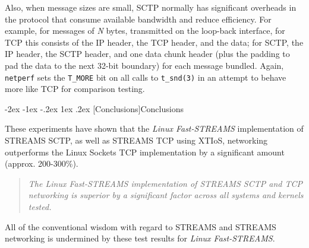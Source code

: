 \documentclass[letterpaper,final,notitlepage,twocolumn,10pt,twoside]{article}
\makeatletter
\let\large = \normalsize
\let\normalsize = \small
\let\small = \footnotesize
\let\footnotesize = \scriptsize
\let\scriptsize = \tiny
\renewcommand\section{\@startsection {section}{1}{\z@}%
                                   {-2ex \@plus -1ex \@minus -.2ex}%
                                   {1ex \@plus .2ex}%
                                   {\normalfont\large\bfseries}}
\makeatother
\begin{document}
Also, when message sizes are small, SCTP normally has significant overheads in the protocol that
consume available bandwidth and reduce efficiency.  For example, for messages of \textsl{N} bytes,
transmitted on the loop-back interface, for TCP this consists of the IP header, the TCP header, and
the data; for SCTP, the IP header, the SCTP header, and one data chunk header (plus the padding to
pad the data to the next 32-bit boundary) for each message bundled.  Again, \texttt{netperf} sets
the \texttt{T\_MORE} bit on all calls to \texttt{t\_snd(3)} in an attempt to behave more like TCP
for comparison testing.

\section[Conclusions]{Conclusions}

These experiments have shown that the \textsl{Linux Fast-STREAMS} implementation of STREAMS SCTP,
as well as STREAMS TCP using XTIoS, networking outperforms the Linux Sockets TCP implementation by a
significant amount (approx. 200-300\%).

\begin{quote}
\textit{The \textsl{Linux Fast-STREAMS} implementation of STREAMS SCTP and TCP networking is
superior by a significant factor across all systems and kernels tested.}
\end{quote}

All of the conventional wisdom with regard to STREAMS and STREAMS networking is undermined by these
test results for \textsl{Linux Fast-STREAMS}.
\end{document}
